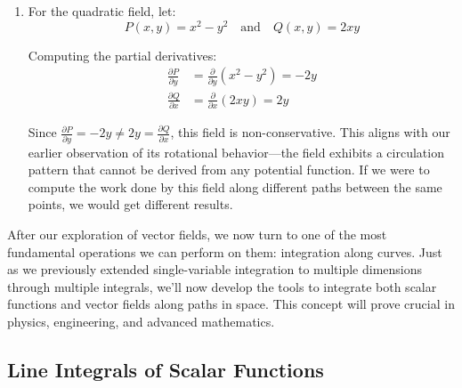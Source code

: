 \begin{example}
\begin{solution}
\begin{enumerate}
   Since $\frac{\partial P}{\partial y} = \frac{\partial Q}{\partial x}$, this field is conservative. Indeed, we can find its potential function: $f(x,y) = \sqrt{x^2+y^2}$. This explains why this normalized field points radially outward—it represents the direction of steepest increase of the distance function from the origin.
   
   \item For the quadratic field, let:
   \[
   P(x,y) = x^2-y^2 \quad \text{and} \quad Q(x,y) = 2xy
   \]
   
   Computing the partial derivatives:
   \begin{align*}
   \frac{\partial P}{\partial y} &= \frac{\partial}{\partial y}(x^2-y^2) = -2y \\
   \frac{\partial Q}{\partial x} &= \frac{\partial}{\partial x}(2xy) = 2y
   \end{align*}
   
   Since $\frac{\partial P}{\partial y} = -2y \neq 2y = \frac{\partial Q}{\partial x}$, this field is non-conservative. This aligns with our earlier observation of its rotational behavior—the field exhibits a circulation pattern that cannot be derived from any potential function. If we were to compute the work done by this field along different paths between the same points, we would get different results.
\end{enumerate}
\end{solution}
\end{example}
\exampleline











\newpage

 

\noindent After our exploration of vector fields, we now turn to one of the most fundamental operations we can perform on them: integration along curves. Just as we previously extended single-variable integration to multiple dimensions through multiple integrals, we'll now develop the tools to integrate both scalar functions and vector fields along paths in space. This concept will prove crucial in physics, engineering, and advanced mathematics.

\subsection*{Line Integrals of Scalar Functions}

